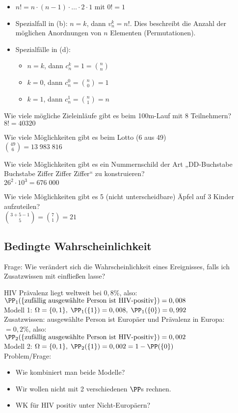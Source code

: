 \begin{itemize}
\item $n!=n\cdot (n-1) \cdot \dots \cdot 2\cdot 1$ mit $0!=1$
\item Spezialfall in (b): $n=k$, dann $v_n^k=n!$. Dies beschreibt die Anzahl der möglichen Anordnungen von $n$ Elementen (Permutationen).
\item Spezialfälle in (d): 
\begin{itemize}
\item $n=k$, dann $c_n^k=1=\binom{n}{n}$
\item $k=0$, dann $c_n^0=\binom{n}{0}=1$
\item $k=1$, dann $c_n^1=\binom{n}{1}=n$
\end{itemize}
\end{itemize}

\begin{anumerate}
\item Wie viele mögliche Zieleinläufe gibt es beim 100m-Lauf mit 8 Teilnehmern?\\
$8!=40320$
\item Wie viele Möglichkeiten gibt es beim Lotto (6 aus 49)\\
$\binom{49}{6}=13\;983\;816$
\item Wie viele Möglichkeiten gibt es ein Nummernschild der Art „DD-Buchstabe Buchstabe Ziffer Ziffer Ziffer“ zu konstruieren?\\
$26^2\cdot 10^3=676 \; 000$
\item Wie viele Möglichkeiten gibt es 5 (nicht unterscheidbare) Äpfel auf 3 Kinder aufzuteilen?\\
$\binom{3+5-1}{5}=\binom{7}{1}=21$
\end{anumerate}

\subsection{Bedingte Wahrscheinlichkeit}
Frage: Wie verändert sich die Wahrscheinlichkeit eines Ereignisses, falls ich Zusatzwissen mit einfließen lasse? 

 HIV Prävalenz liegt weltweit bei $0,8\%$, also:\\
$\PP_1 (\{\text{zufällig ausgewählte Person ist HIV-positiv\}})=0,008$\\
Modell 1: $\Omega =\{0,1\},\; \PP_1 ( \{1\}) = 0,008, \; \PP_1(\{0\})=0,992$\\
Zusatzwissen: ausgewählte Person ist Europäer und Prävalenz in Europa: $=0,2\%$, also:\\
$\PP_2 (\{\text{zufällig ausgewählte Person ist HIV-positiv\}})=0,002$\\
Modell 2: $\Omega = \{0,1\}, \; \PP_2(\{1\})=0,002=1-\PP(\{0\})$\\
Problem/Frage:
\begin{itemize}
\item Wie kombiniert man beide Modelle?
\item Wir wollen nicht mit 2 verschiedenen $\PP$s rechnen.
\item WK für HIV positiv unter Nicht-Europäern?
\end{itemize}

